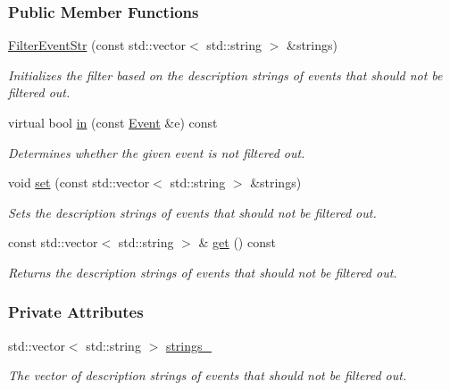 \subsubsection*{Public Member Functions}
\begin{DoxyCompactItemize}
\item 
\hyperlink{structFilterEventStr_ab62183e962b806c35dc9f905e9dc5ed8}{Filter\+Event\+Str} (const std\+::vector$<$ std\+::string $>$ \&strings)
\begin{DoxyCompactList}\small\item\em Initializes the filter based on the description strings of events that should not be filtered out. \end{DoxyCompactList}\item 
virtual bool \hyperlink{structFilterEventStr_a21087cd9792d038bdb14da550ec9a137}{in} (const \hyperlink{structFilterBase_a78af2a738ffab6c352d6c4ad0d148a01}{Event} \&e) const 
\begin{DoxyCompactList}\small\item\em Determines whether the given event is not filtered out. \end{DoxyCompactList}\item 
void \hyperlink{structFilterEventStr_a3ee735bc4531464244ce7c4b01cefc34}{set} (const std\+::vector$<$ std\+::string $>$ \&strings)
\begin{DoxyCompactList}\small\item\em Sets the description strings of events that should not be filtered out. \end{DoxyCompactList}\item 
const std\+::vector$<$ std\+::string $>$ \& \hyperlink{structFilterEventStr_ade90d4b2cf8579335fc6c1600c5a4706}{get} () const 
\begin{DoxyCompactList}\small\item\em Returns the description strings of events that should not be filtered out. \end{DoxyCompactList}\end{DoxyCompactItemize}
\subsubsection*{Private Attributes}
\begin{DoxyCompactItemize}
\item 
std\+::vector$<$ std\+::string $>$ \hyperlink{structFilterEventStr_a63e2ebb946d1fc05386ddc618794aa8e}{strings\+\_\+}\hypertarget{structFilterEventStr_a63e2ebb946d1fc05386ddc618794aa8e}{}\label{structFilterEventStr_a63e2ebb946d1fc05386ddc618794aa8e}

\begin{DoxyCompactList}\small\item\em The vector of description strings of events that should not be filtered out. \end{DoxyCompactList}\end{DoxyCompactItemize}


